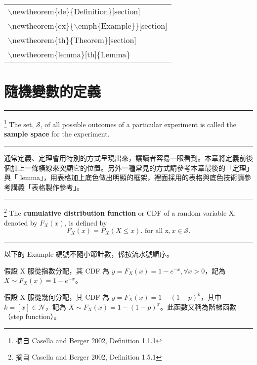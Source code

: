  \begin{center}{\begin{tabular}{l}
 $\backslash$newtheorem\{de\}\{Definition\}[section]\\
 $\backslash$newtheorem\{ex\}\{$\backslash$emph\{Example\}\}[section]\\
 $\backslash$newtheorem\{th\}\{Theorem\}[section]\\
 $\backslash$newtheorem\{lemma\}[th]\{Lemma\}\\
\end{tabular}}\end{center}


\section{{\MB 隨機變數的定義}}
 \rule{\textwidth}{0.2pt}
 \begin{de}\footnote{摘自 Casella and Berger 2002, Definition 1.1.1}  %
The set, $\mathcal{S}$, of all possible outcomes of a particular experiment is called the \textbf{sample space} for the experiment.\\
 \rule{\textwidth}{0.2pt}
\end{de}
\noindent 通常定義、定理會用特別的方式呈現出來，讓讀者容易一眼看到。本章將定義前後個加上一條橫線來突顯它的位置。另外一種常見的方式請參考本章最後的「定理」與「 lemma」，用表格加上底色做出明顯的框架，裡面採用的表格與底色技術請參考講義「表格製作參考」。

\noindent \rule{\textwidth}{0.2pt}
\begin{de}\footnote{摘自 Casella and Berger 2002, Definition 1.5.1} %
The \textbf{cumulative distribution function}  or CDF of a random variable X, denoted by $F_X(x)$,
is defined by
\[F_X(x)=P_X(X \leq x). \mbox{ for all x}, x\in \mathcal{S}.\]
 \rule{\textwidth}{0.2pt}
\end{de}
\noindent 以下的 Example 編號不隨小節計數，係按流水號順序。
\begin{ex}[指數分配隨機變數的呈現] %
假設  X 服從指數分配，其 CDF 為 $y=F_X(x)=1-e^{-x}, \forall x>0$，記為 $X\sim F_X(x)=1-e^{-x}$。
\end{ex}

\begin{ex}[幾何分配隨機變數的呈現] %
假設 X 服從幾何分配，其 CDF 為 $y=F_X(x)=1-(1-p)^k$，其中 $k=[x]\in \mathcal{N}$，記為 $X\sim F_X(x)=1-(1-p)^x$。此函數又稱為階梯函數（step function）。
\end{ex}


